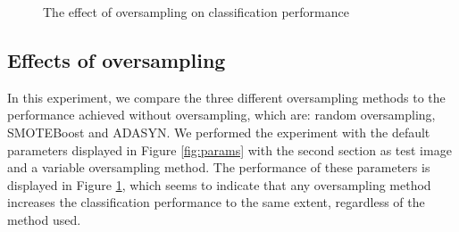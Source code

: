 \datathree

\begin{figure}[]
	\caption{The effect of oversampling on classification performance}
	\label{fig:res_bar_3}
\end{figure}

\subsection{Effects of oversampling}
In this experiment, we compare the three different oversampling methods to the performance achieved without oversampling, which are: random oversampling, SMOTEBoost and ADASYN. We performed the experiment with the default parameters displayed in Figure \ref{fig:params} with the second section as test image and a variable oversampling method. The performance of these parameters is displayed in Figure \ref{fig:res_bar_3}, which seems to indicate that any oversampling method increases the classification performance to the same extent, regardless of the method used.




